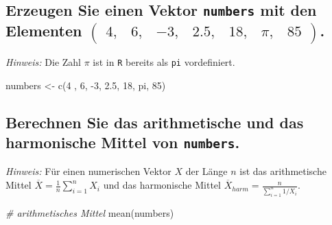 \documentclass[12pt,a4paper]{article}
\newenvironment{Shaded}{\begin{snugshade}}{\end{snugshade}}
\newcommand{\CommentTok}[1]{\textcolor[rgb]{0.56,0.35,0.01}{\textit{#1}}}
\newcommand{\DecValTok}[1]{\textcolor[rgb]{0.00,0.00,0.81}{#1}}
\newcommand{\FloatTok}[1]{\textcolor[rgb]{0.00,0.00,0.81}{#1}}
\newcommand{\FunctionTok}[1]{\textcolor[rgb]{0.00,0.00,0.00}{#1}}
\newcommand{\NormalTok}[1]{#1}
\newcommand{\OtherTok}[1]{\textcolor[rgb]{0.56,0.35,0.01}{#1}}
\newcommand{\SpecialCharTok}[1]{\textcolor[rgb]{0.00,0.00,0.00}{#1}}
\begin{document}
\hypertarget{erzeugen-sie-einen-vektor-mit-den-elementen-beginpmatrix-4-6--3-2.5-18-pi-85-endpmatrix.}{%
\subsection{\texorpdfstring{Erzeugen Sie einen Vektor \texttt{numbers}
mit den Elementen
\(\begin{pmatrix} 4, & 6, & -3, & 2.5, & 18, & \pi, & 85 \end{pmatrix}\).}{Erzeugen Sie einen Vektor  mit den Elementen \textbackslash begin\{pmatrix\} 4, \& 6, \& -3, \& 2.5, \& 18, \& \textbackslash pi, \& 85 \textbackslash end\{pmatrix\}.}}\label{erzeugen-sie-einen-vektor-mit-den-elementen-beginpmatrix-4-6--3-2.5-18-pi-85-endpmatrix.}}

\emph{Hinweis:} Die Zahl \(\pi\) ist in \texttt{R} bereits als
\texttt{pi} vordefiniert.

\begin{Shaded}
\begin{Highlighting}[]
\NormalTok{    numbers }\OtherTok{\textless{}{-}} \FunctionTok{c}\NormalTok{(}\DecValTok{4}\NormalTok{ , }\DecValTok{6}\NormalTok{, }\SpecialCharTok{{-}}\DecValTok{3}\NormalTok{, }\FloatTok{2.5}\NormalTok{, }\DecValTok{18}\NormalTok{, pi, }\DecValTok{85}\NormalTok{)}
\end{Highlighting}
\end{Shaded}

\vspace{0.5cm}

\hypertarget{berechnen-sie-das-arithmetische-und-das-harmonische-mittel-von-.}{%
\subsection{\texorpdfstring{Berechnen Sie das arithmetische und das
harmonische Mittel von
\texttt{numbers}.}{Berechnen Sie das arithmetische und das harmonische Mittel von .}}\label{berechnen-sie-das-arithmetische-und-das-harmonische-mittel-von-.}}

\emph{Hinweis:} Für einen numerischen Vektor \(X\) der Länge \(n\) ist
das arithmetische Mittel \(\overline{X} = \frac{1}{n} \sum_{i=1}^n X_i\)
und das harmonische Mittel
\(\overline{X}_{harm} = \frac{n}{\sum_{i=1}^n 1/X_i}\).

\begin{Shaded}
\begin{Highlighting}[]
    \CommentTok{\# arithmetisches Mittel}
    \FunctionTok{mean}\NormalTok{(numbers) }
\end{Highlighting}
\end{Shaded}
\end{document}
